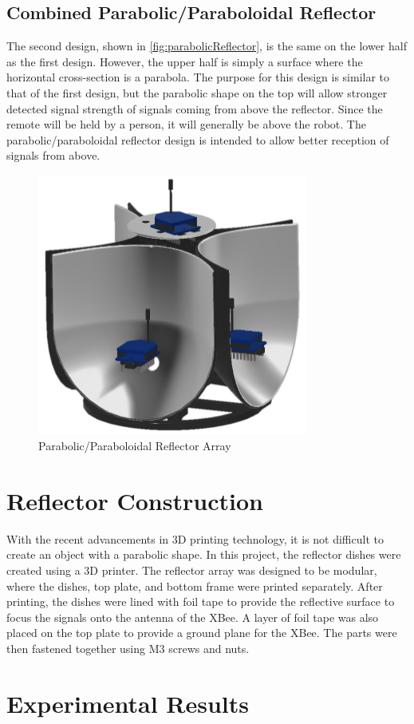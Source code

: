 \subsection{Combined Parabolic/Paraboloidal Reflector}
The second design, shown in \autoref{fig:parabolicReflector}, is the same on the lower half as the first design. However, the upper half is simply a surface where the horizontal cross-section is a parabola. The purpose for this design is similar to that of the first design, but the parabolic shape on the top will allow stronger detected signal strength of signals coming from above the reflector. Since the remote will be held by a person, it will generally be above the robot. The parabolic/paraboloidal reflector design is intended to allow better reception of signals from above.
\begin{figure}
    \centering
    \includegraphics[width=3.5in]{figs/img/parabolicReflector.png}
    \caption{Parabolic/Paraboloidal Reflector Array}
    \label{fig:parabolicReflector}
\end{figure}

\section{Reflector Construction}
With the recent advancements in 3D printing technology, it is not difficult to create an object with a parabolic shape. In this project, the reflector dishes were created using a 3D printer. The reflector array was designed to be modular, where the dishes, top plate, and bottom frame were printed separately. After printing, the dishes were lined with foil tape to provide the reflective surface to focus the signals onto the antenna of the XBee. A layer of foil tape was also placed on the top plate to provide a ground plane for the XBee. The parts were then fastened together using M3 screws and nuts.

\section{Experimental Results}


